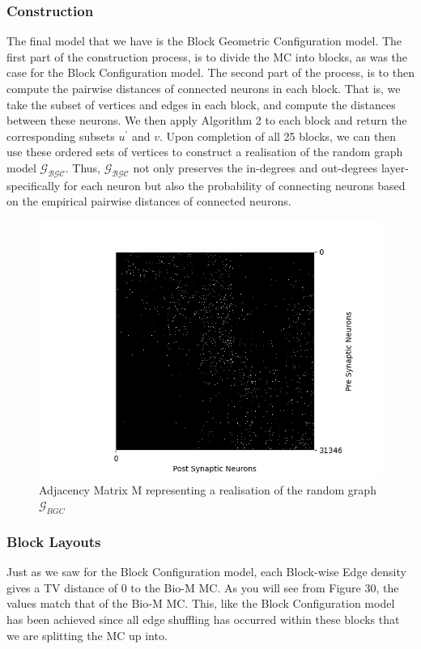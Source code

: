 \subsubsection{Construction}
The final model that we have is the Block Geometric Configuration model. The first part of the construction process, is to divide the MC into blocks, as was the case for the Block Configuration model. The second part of the process, is to then compute the pairwise distances of connected neurons in each block. That is, we take the subset of vertices and edges in each block, and compute the distances between these neurons. We then apply Algorithm 2 to each block and return the corresponding subsets $u^\prime$ and $v$. Upon completion of all 25 blocks, we can then use these ordered sets of vertices to construct a realisation of the random graph model $\mathcal{G_{BGC}}$. Thus, $\mathcal{G_{BGC}}$ not only preserves the in-degrees and out-degrees layer-specifically for each neuron but also the probability of connecting neurons based on the empirical pairwise distances of connected neurons.

\begin{figure}[H]
\begin{center}
\captionsetup{justification=centering}
\includegraphics[width=12cm]{GBC/matrix_BGC.png}
\caption{Adjacency Matrix M representing a realisation of the random graph $\mathcal{G}_{BGC}$}
\end{center}
\end{figure}


\subsubsection{Block Layouts}
Just as we saw for the Block Configuration model, each Block-wise Edge density gives a TV distance of 0 to the Bio-M MC. As you will see from Figure 30, the values match that of the Bio-M MC. This, like the Block Configuration model has been achieved since all edge shuffling has occurred within these blocks that we are splitting the MC up into.

